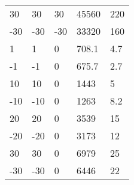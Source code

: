 \begin{table}
\begin{tabular}{lllll}
  30    &    30     &     30     &      45560  &     220\\
  -30   &    -30    &     -30    &      33320  &     160\\
  1     &    1      &     0      &      708.1  &     4.7\\
  -1    &    -1     &     0      &      675.7  &     2.7\\
  10    &    10     &     0      &      1443   &     5\\
  -10   &    -10    &     0      &      1263   &     8.2\\
  20    &    20     &     0      &      3539   &     15\\
  -20   &    -20    &     0      &      3173   &     12\\
  30    &    30     &     0      &      6979   &     25\\
  -30   &    -30    &     0      &      6446   &     22\\
    \bottomrule
  \end{tabular}
  \label{tab:lit2}
\end{table}
